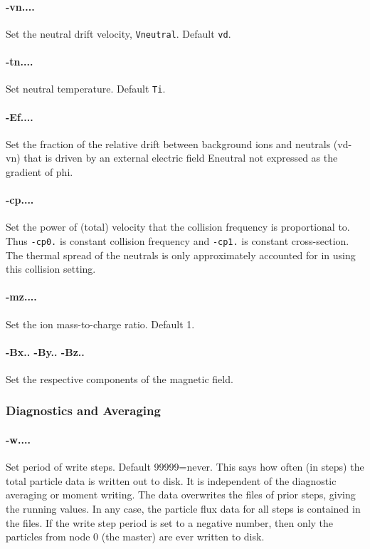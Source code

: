 \documentclass[12pt]{article}
\begin{document}
\paragraph{-vn....} Set the neutral drift velocity, \verb!Vneutral!. Default \verb!vd!.

\paragraph{-tn....} Set neutral temperature. Default \verb!Ti!. 

\paragraph{-Ef....} Set the fraction of the relative drift between
background ions and neutrals (vd-vn) that is driven by an external
electric field Eneutral not expressed as the gradient of phi.

\paragraph{-cp....} Set the power of (total) velocity that the
collision frequency is proportional to. Thus \verb!-cp0.! is constant
collision frequency and \verb!-cp1.! is constant cross-section. The
thermal spread of the neutrals is only approximately accounted for in
using this collision setting.

\paragraph{-mz....} Set the ion mass-to-charge ratio. Default 1.

\paragraph{-Bx.. -By.. -Bz..} Set the respective components of the
magnetic field. 

\subsubsection*{Diagnostics and Averaging}

\paragraph{-w....}  Set period of write steps. Default 99999=never.
This says how often (in steps) the total particle data is written out to
disk. It is independent of the diagnostic averaging or moment writing.
The data overwrites the files of prior steps, giving the running
values. In any case, the particle flux data for all steps is contained in
the files. If the write step period is set to a negative number, then
only the particles from node 0 (the master) are ever
written to disk. 
\end{document}

